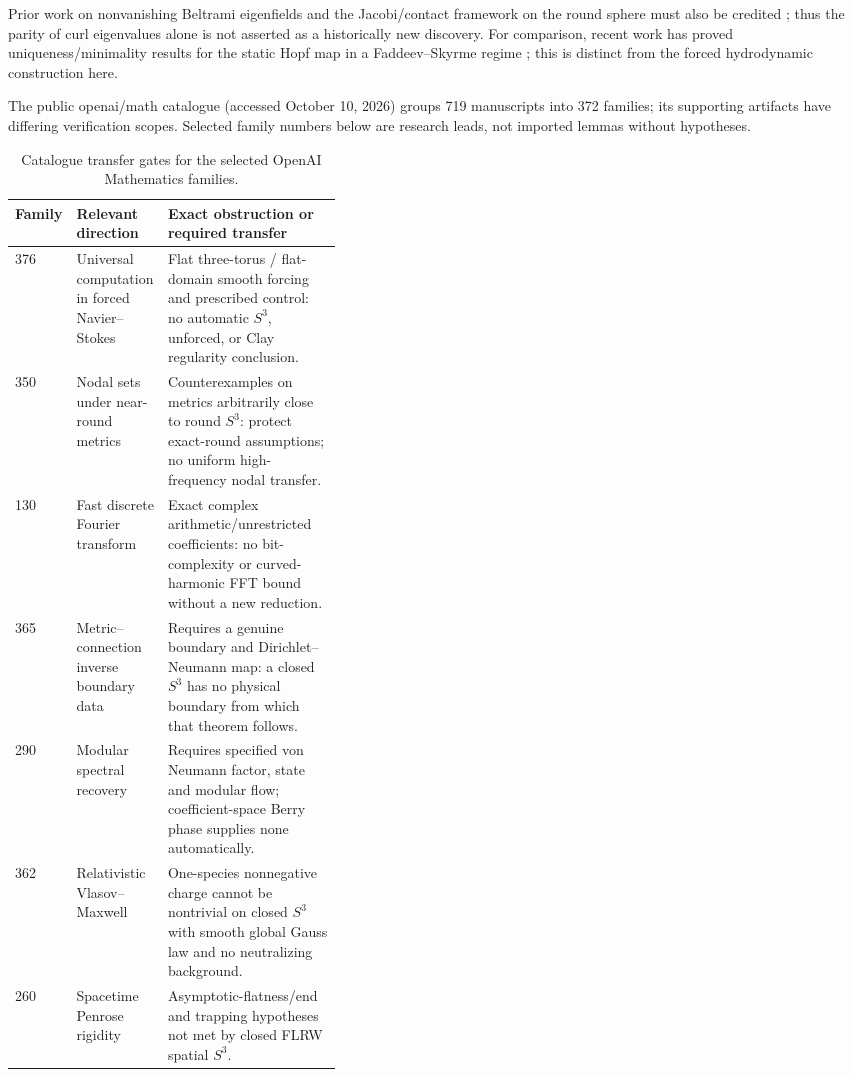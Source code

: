 \documentclass[10pt,letterpaper]{article}
\theoremstyle{remark}
\begin{document}
Prior work on nonvanishing Beltrami eigenfields and the Jacobi/contact framework on the round sphere must also be credited \cite{ref13}; thus the parity of curl eigenvalues alone is not asserted as a historically new discovery. For comparison, recent work has proved uniqueness/minimality results for the static Hopf map in a Faddeev–Skyrme regime \cite{ref14}; this is distinct from the forced hydrodynamic construction here.


The public openai/math catalogue (accessed October 10, 2026) groups 719 manuscripts into 372 families; its supporting artifacts have differing verification scopes. Selected family numbers below are research leads, not imported lemmas without hypotheses.



\begin{table}[htbp]
\centering\footnotesize
\caption{Catalogue transfer gates for the selected OpenAI Mathematics families.}
\begin{tabularx}{\linewidth}{@{}p{0.09\linewidth}p{0.29\linewidth}X@{}}
\toprule
Family & Relevant direction & Exact obstruction or required transfer \\
\midrule
376 & Universal computation in forced Navier--Stokes & Flat three-torus / flat-domain smooth forcing and prescribed control: no automatic $S^3$, unforced, or Clay regularity conclusion.\\
350 & Nodal sets under near-round metrics & Counterexamples on metrics arbitrarily close to round $S^3$: protect exact-round assumptions; no uniform high-frequency nodal transfer.\\
130 & Fast discrete Fourier transform & Exact complex arithmetic/unrestricted coefficients: no bit-complexity or curved-harmonic FFT bound without a new reduction.\\
365 & Metric--connection inverse boundary data & Requires a genuine boundary and Dirichlet--Neumann map: a closed $S^3$ has no physical boundary from which that theorem follows.\\
290 & Modular spectral recovery & Requires specified von Neumann factor, state and modular flow; coefficient-space Berry phase supplies none automatically.\\
362 & Relativistic Vlasov--Maxwell & One-species nonnegative charge cannot be nontrivial on closed $S^3$ with smooth global Gauss law and no neutralizing background.\\
260 & Spacetime Penrose rigidity & Asymptotic-flatness/end and trapping hypotheses not met by closed FLRW spatial $S^3$.\\
\bottomrule
\end{tabularx}
\end{table}
\end{document}
